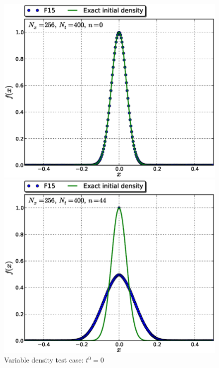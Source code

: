 \documentclass[11pt,titlepage]{report}
\begin{document}
\begin{figure}[h!] 
\label{fig:var_vel}
\captionsetup{width=0.48\linewidth}
\begin{minipage}[b]{0.5\linewidth}
\centering
\includegraphics[width=\linewidth]{graphics/f_N_v_S_F15_Nx256Nt400_w_f0_it00000}
\caption{Variable density test case: $t^0 = 0$}
\vspace{4ex}
\end{minipage}%
\begin{minipage}[b]{0.5\linewidth}
\centering
\includegraphics[width=\linewidth]{graphics/f_N_v_S_F15_Nx256Nt400_w_f0_it00044}

\end{minipage}
\end{figure}
\end{document}
